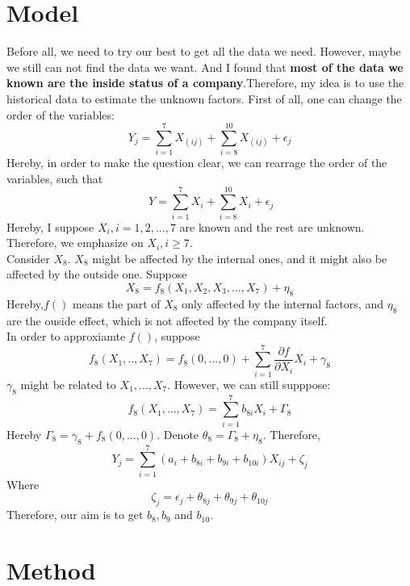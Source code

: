 \documentclass[11pt]{article}
\begin{document}
\section{Model}
Before all, we need to try our best to get all the data we need. However, maybe we still can not find the data we want. And I found that \textbf{most of the data we known are the inside status of a company}.Therefore, my idea is to use the historical data to estimate the unknown factors. First of all, one can change the order of the variables:
\begin{equation}
Y_j=\sum_{i=1}^{7} X_{(ij)}+\sum_{i=8}^{10} X_{(ij)}+\epsilon_j
\end{equation}
Hereby, in order to make the question clear, we can rearrage the order of the variables, such that
\begin{equation}\
Y=\sum_{i=1}^{7} X_i +\sum_{i=8}^{10} X_i+\epsilon_j
\end{equation}
Hereby, I suppose $X_i,i=1,2,...,7$ are known and the rest are unknown. Therefore, we emphasize on $X_i, i\geq 7$.\\
Consider $X_8$. $X_8$ might be affected by the internal ones, and it might also be affected by the outside one. Suppose\\
\begin{equation}
X_{8}=f_8{}(X_1,X_2,X_3,...,X_7)+\eta_8
\end{equation}
Hereby,$f()$ means the part of $X_8$ only affected by the internal factors, and $\eta_8$ are the ouside effect, which is not affected by the company itself. \\
In order to approxiamte $f()$, suppose
\begin{equation}
f_8(X_1,..,X_7)=f_8(0,...,0)+\sum_{i=1}^7 \frac{\partial f}{\partial X_i} X_i+ \gamma_8
\end{equation}
$\gamma_8$ might be related to $X_1,...,X_7$. However, we can still supppose:
\begin{equation}
f_8(X_1,...,X_7)=\sum_{i=1}^7 b_{8i} X_i+\Gamma_8
\end{equation}
Hereby $\Gamma_8=\gamma_8+f_8(0,...,0)$. Denote $\theta_8=\Gamma_8+\eta_8$.
Therefore,
\begin{equation}
Y_j=\sum_{i=1}^7 (a_i+b_{8i}+b_{9i}+b_{10i}){}X_{ij}+\zeta_j
\end{equation}
Where
$$\zeta_j=\epsilon_j+\theta_{8j}+\theta_{9j}+\theta_{10j}$$
Therefore, our aim is to get $b_8,b_9$ and $b_{10}$.
\section{Method}
\end{document}
